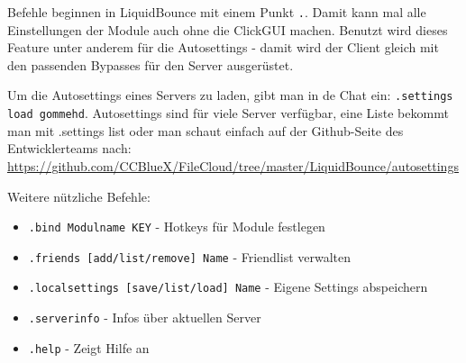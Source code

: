 Befehle beginnen in LiquidBounce mit einem Punkt \texttt{.}. Damit kann mal alle Einstellungen der Module auch ohne die ClickGUI machen. Benutzt wird dieses Feature unter anderem für die Autosettings - damit wird der Client gleich mit den passenden Bypasses für den Server ausgerüstet.

Um die Autosettings eines Servers zu laden, gibt man in de Chat ein: \texttt{.settings load gommehd}. Autosettings sind für viele Server verfügbar, eine Liste bekommt man mit .settings list oder man schaut einfach auf der Github-Seite des Entwicklerteams nach: \url{https://github.com/CCBlueX/FileCloud/tree/master/LiquidBounce/autosettings}

Weitere nützliche Befehle:
\begin{itemize}
    \item \texttt{.bind Modulname KEY} - Hotkeys für Module festlegen
    \item \texttt{.friends [add/list/remove] Name} - Friendlist verwalten
    \item \texttt{.localsettings [save/list/load] Name} - Eigene Settings abspeichern
    \item \texttt{.serverinfo} - Infos über aktuellen Server
    \item \texttt{.help} - Zeigt Hilfe an
\end{itemize}